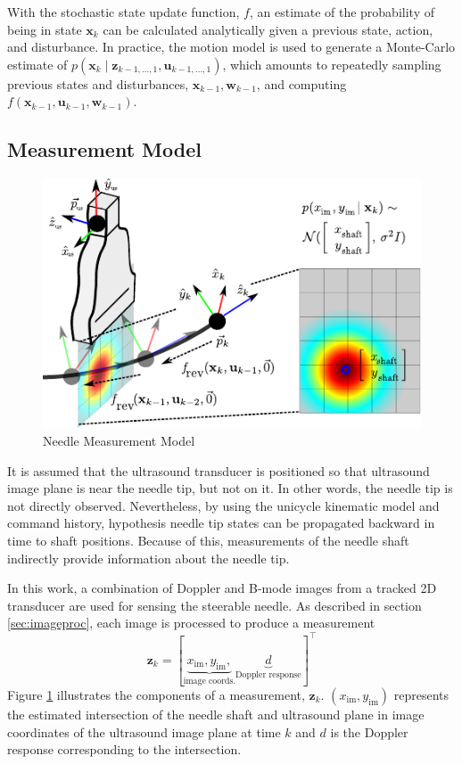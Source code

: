 \documentclass[journal,transmag]{IEEEtran}
\newcommand{\bvar}[2]{\mathbf{#1}_{#2}}
\newcommand{\imcoords}{(x_{\text{im}},y_{\text{im}})}
\begin{document}
With the stochastic state update function, $f$, an estimate of the probability of being in state $\bvar{x}{k}$ can be calculated analytically given a previous state, action, and disturbance.  In practice, the motion model is used to generate a Monte-Carlo estimate of $p(\bvar{x}{k} \mid  \bvar{z}{k-1,...,1}, \bvar{u}{k-1,...,1})$, which amounts to repeatedly sampling previous states and disturbances, $\bvar{x}{k-1}, \bvar{w}{k-1}$, and computing $f(\bvar{x}{k-1}, \bvar{u}{k-1}, \bvar{w}{k-1})$.  
\subsection{Measurement Model} \label{subsec:measurement}
\begin{figure}[]
\centering
\includegraphics[scale=1]{Figures/NeedleMeasurements.pdf}
\caption{Needle Measurement Model}
\label{fig_mm}
\end{figure}
It is assumed that the ultrasound transducer is positioned so that ultrasound image plane is near the needle tip, but not on it.  In other words, the needle tip is not directly observed.  Nevertheless, by using the unicycle kinematic model and command history, hypothesis needle tip states can be propagated backward in time to shaft positions.  Because of this, measurements of the needle shaft indirectly provide information about the needle tip.

In this work, a combination of Doppler and B-mode images from a tracked 2D transducer are used for sensing the steerable needle.  As described in section \ref{sec:imageproc}, each image is processed to produce a measurement
\begin{dmath*}
\bvar{z}{k} = \left[\underbrace{x_{\text{im}},y_{\text{im}},}_{\text{image coords.}} \underbrace{d}_{\text{Doppler response}}\right]^\top
\end{dmath*}
Figure \ref{fig_mm} illustrates the components of a measurement, $\bvar{z}{k}$.  $\imcoords$ represents the estimated intersection of the needle shaft and ultrasound plane in image coordinates of the ultrasound image plane at time $k$ and $d$ is the Doppler response corresponding to the intersection.
\end{document}
